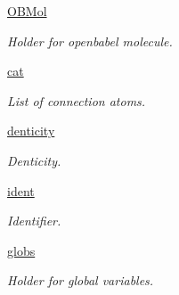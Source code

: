 \begin{DoxyCompactItemize}
\hyperlink{classmolSimplify_1_1Classes_1_1mol3D_1_1mol3D_ac6f2ce6966f1126c52b32f0aa40612a4}{O\+B\+Mol}
\begin{DoxyCompactList}\small\item\em Holder for openbabel molecule. \end{DoxyCompactList}\item 
\hyperlink{classmolSimplify_1_1Classes_1_1mol3D_1_1mol3D_a7cec79699a619b85d5e23e869327749b}{cat}
\begin{DoxyCompactList}\small\item\em List of connection atoms. \end{DoxyCompactList}\item 
\hyperlink{classmolSimplify_1_1Classes_1_1mol3D_1_1mol3D_a5bdeed75bc96b42a06b2ea277b431739}{denticity}
\begin{DoxyCompactList}\small\item\em Denticity. \end{DoxyCompactList}\item 
\hyperlink{classmolSimplify_1_1Classes_1_1mol3D_1_1mol3D_a606148a9c1137fcad6528b1e5c34a5c4}{ident}
\begin{DoxyCompactList}\small\item\em Identifier. \end{DoxyCompactList}\item 
\hyperlink{classmolSimplify_1_1Classes_1_1mol3D_1_1mol3D_a6f203eafd5348c5bd650356edda9b84a}{globs}
\begin{DoxyCompactList}\small\item\em Holder for global variables. \end{DoxyCompactList}\end{DoxyCompactItemize}
